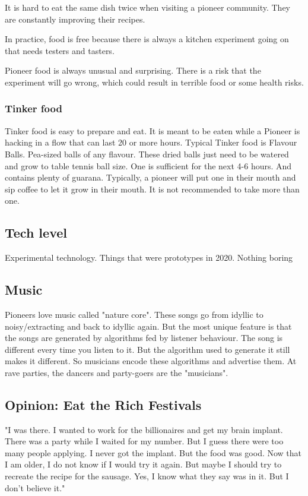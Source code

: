 It is hard to eat the same dish twice when visiting a pioneer community. They are constantly improving their recipes.

In practice, food is free because there is always a kitchen experiment going on that needs testers and tasters.

Pioneer food is always unusual and surprising. There is a risk that the experiment will go wrong, which could result in terrible food or some health risks.

\subsubsection{Tinker food}

Tinker food is easy to prepare and eat. It is meant to be eaten while a Pioneer is hacking in a flow that can last 20 or more hours. Typical Tinker food is Flavour Balls. Pea-sized balls of any flavour. These dried balls just need to be watered and grow to table tennis ball size. One is sufficient for the next 4-6 hours. And contains plenty of guarana.
Typically, a pioneer will put one in their mouth and sip coffee to let it grow in their mouth. It is not recommended to take more than one.

\subsection{Tech level}

Experimental technology. Things that were prototypes in 2020. Nothing boring

\subsection{Music}

Pioneers love music called "nature core". These songs go from idyllic to noisy/extracting and back to idyllic again. But the most unique feature is that the songs are generated by algorithms fed by listener behaviour.
The song is different every time you listen to it. But the algorithm used to generate it still makes it different. So musicians encode these algorithms and advertise them. At rave parties, the dancers and party-goers are the "musicians".

\subsection{Opinion: Eat the Rich Festivals}

"I was there. I wanted to work for the billionaires and get my brain implant. There was a party while I waited for my number. But I guess there were too many people applying. I never got the implant. But the food was good. Now that I am older, I do not know if I would try it again. But maybe I should try to recreate the recipe for the sausage. Yes, I know what they say was in it. But I don't believe it."

